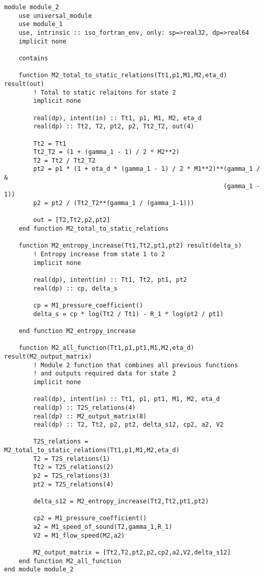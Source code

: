 \begin{verbatim}
module module_2
    use universal_module
    use module_1
    use, intrinsic :: iso_fortran_env, only: sp=>real32, dp=>real64
    implicit none

    contains

    function M2_total_to_static_relations(Tt1,p1,M1,M2,eta_d) result(out)
        ! Total to static relaitons for state 2
        implicit none

        real(dp), intent(in) :: Tt1, p1, M1, M2, eta_d
        real(dp) :: Tt2, T2, pt2, p2, Tt2_T2, out(4)

        Tt2 = Tt1
        Tt2_T2 = (1 + (gamma_1 - 1) / 2 * M2**2)
        T2 = Tt2 / Tt2_T2
        pt2 = p1 * (1 + eta_d * (gamma_1 - 1) / 2 * M1**2)**(gamma_1 / &
                                                            (gamma_1 - 1))
        p2 = pt2 / (Tt2_T2**(gamma_1 / (gamma_1-1)))

        out = [T2,Tt2,p2,pt2]
    end function M2_total_to_static_relations

    function M2_entropy_increase(Tt1,Tt2,pt1,pt2) result(delta_s)
        ! Entropy increase from state 1 to 2
        implicit none

        real(dp), intent(in) :: Tt1, Tt2, pt1, pt2
        real(dp) :: cp, delta_s

        cp = M1_pressure_coefficient()
        delta_s = cp * log(Tt2 / Tt1) - R_1 * log(pt2 / pt1)

    end function M2_entropy_increase
    
    function M2_all_function(Tt1,p1,pt1,M1,M2,eta_d) result(M2_output_matrix)
        ! Module 2 function that combines all previous functions
        ! and outputs required data for state 2
        implicit none

        real(dp), intent(in) :: Tt1, p1, pt1, M1, M2, eta_d
        real(dp) :: T2S_relations(4)
        real(dp) :: M2_output_matrix(8)
        real(dp) :: T2, Tt2, p2, pt2, delta_s12, cp2, a2, V2

        T2S_relations = M2_total_to_static_relations(Tt1,p1,M1,M2,eta_d)
        T2 = T2S_relations(1)
        Tt2 = T2S_relations(2)
        p2 = T2S_relations(3)
        pt2 = T2S_relations(4)

        delta_s12 = M2_entropy_increase(Tt2,Tt2,pt1,pt2)

        cp2 = M1_pressure_coefficient()
        a2 = M1_speed_of_sound(T2,gamma_1,R_1)
        V2 = M1_flow_speed(M2,a2)

        M2_output_matrix = [Tt2,T2,pt2,p2,cp2,a2,V2,delta_s12]
    end function M2_all_function
end module module_2
\end{verbatim}